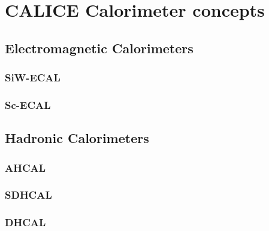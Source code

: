 \chapter{CALICE Calorimeter concepts}

\section{Electromagnetic Calorimeters}

\subsection{SiW-ECAL}
\subsection{Sc-ECAL}
\label{subsec:ScECAL}

\section{Hadronic Calorimeters}

\subsection{AHCAL}
\label{subsec:SPIROC2B}

\subsection{SDHCAL}
\subsection{DHCAL}
